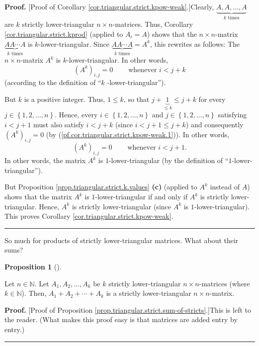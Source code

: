 \documentclass[numbers=enddot,12pt,final,onecolumn,notitlepage]{scrartcl}%
\theoremstyle{definition}
\newtheorem{prop}[theo]{Proposition}
\newenvironment{proposition}[1][]
{\begin{prop}[#1]\begin{leftbar}}
{\end{leftbar}\end{prop}}
\newenvironment{proof}[1][Proof]{\noindent\textbf{#1.} }{\ \rule{0.5em}{0.5em}}
\begin{document}
\begin{proof}
[Proof of Corollary \ref{cor.triangular.strict.kpow-weak}.]Clearly,
$\underbrace{A,A,\ldots,A}_{k\text{ times}}$ are $k$ strictly lower-triangular
$n\times n$-matrices. Thus, Corollary \ref{cor.triangular.strict.kprod}
(applied to $A_{i}=A$) shows that the $n\times n$-matrix $\underbrace{AA\cdots
A}_{k\text{ times}}$ is $k$-lower-triangular. Since $\underbrace{AA\cdots
A}_{k\text{ times}}=A^{k}$, this rewrites as follows: The $n\times n$-matrix
$A^{k}$ is $k$-lower-triangular. In other words,%
\begin{equation}
\left(  A^{k}\right)  _{i,j}=0\ \ \ \ \ \ \ \ \ \ \text{whenever }i<j+k
\label{pf.cor.triangular.strict.kpow-weak.1}%
\end{equation}
(according to the definition of \textquotedblleft$k$%
-lower-triangular\textquotedblright).

But $k$ is a positive integer. Thus, $1\leq k$, so that $j+\underbrace{1}%
_{\leq k}\leq j+k$ for every $j\in\left\{  1,2,\ldots,n\right\}  $. Hence,
every $i\in\left\{  1,2,\ldots,n\right\}  $ and $j\in\left\{  1,2,\ldots
,n\right\}  $ satisfying $i<j+1$ must also satisfy $i<j+k$ (since $i<j+1\leq
j+k$) and consequently $\left(  A^{k}\right)  _{i,j}=0$ (by
(\ref{pf.cor.triangular.strict.kpow-weak.1})). In other words,
\[
\left(  A^{k}\right)  _{i,j}=0\ \ \ \ \ \ \ \ \ \ \text{whenever }i<j+1.
\]
In other words, the matrix $A^{k}$ is $1$-lower-triangular (by the definition
of \textquotedblleft$1$-lower-triangular\textquotedblright).

But Proposition \ref{prop.triangular.strict.k.values} \textbf{(c)} (applied to
$A^{k}$ instead of $A$) shows that the matrix $A^{k}$ is $1$-lower-triangular
if and only if $A^{k}$ is strictly lower-triangular. Hence, $A^{k}$ is
strictly lower-triangular (since $A^{k}$ is $1$-lower-triangular). This proves
Corollary \ref{cor.triangular.strict.kpow-weak}.
\end{proof}

So much for products of strictly lower-triangular matrices. What about their sums?

\begin{proposition}
\label{prop.triangular.strict.sum-of-stricts}Let $n\in\mathbb{N}$. Let
$A_{1},A_{2},\ldots,A_{k}$ be $k$ strictly lower-triangular $n\times
n$-matrices (where $k\in\mathbb{N}$). Then, $A_{1}+A_{2}+\cdots+A_{k}$ is a
strictly lower-triangular $n\times n$-matrix.
\end{proposition}

\begin{proof}
[Proof of Proposition \ref{prop.triangular.strict.sum-of-stricts}.]This is
left to the reader. (What makes this proof easy is that matrices are added
entry by entry.)
\end{proof}
\end{document}
